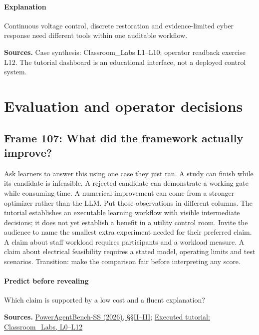 \documentclass[11pt]{article}
\begin{document}
\paragraph{Explanation}Continuous voltage control, discrete restoration and evidence-limited cyber response need different tools within one auditable workflow.
\par\nopagebreak\begin{minipage}{\linewidth}{\footnotesize\color{slate}\textbf{Sources.} Case synthesis: Classroom\_Labs L1--L10; operator readback exercise L12. The tutorial dashboard is an educational interface, not a deployed control system.\par}\end{minipage}\par\medskip
\clearpage\section{Evaluation and operator decisions}
\subsection*{Frame 107: What did the framework actually improve?}
Ask learners to answer this using one case they just ran. A study can finish while its candidate is infeasible. A rejected candidate can demonstrate a working gate while consuming time. A numerical improvement can come from a stronger optimizer rather than the LLM. Put those observations in different columns. The tutorial establishes an executable learning workflow with visible intermediate decisions; it does not yet establish a benefit in a utility control room. Invite the audience to name the smallest extra experiment needed for their preferred claim. A claim about staff workload requires participants and a workload measure. A claim about electrical feasibility requires a stated model, operating limits and test scenarios. Transition: make the comparison fair before interpreting any score.\par
\paragraph{Predict before revealing}Which claim is supported by a low cost and a fluent explanation?
\par\nopagebreak\begin{minipage}{\linewidth}{\footnotesize\color{slate}\textbf{Sources.} \href{https://arxiv.org/html/2606.18789v1}{PowerAgentBench-SS (2026), \S{}\S{}II--III}; \href{../Classroom_Labs.html}{Executed tutorial: Classroom\_Labs, L0--L12}\par}\end{minipage}\par\medskip
\end{document}
